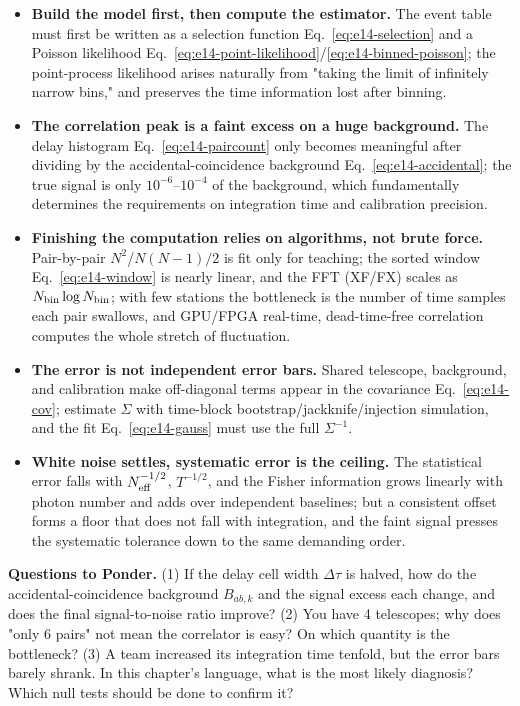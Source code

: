 \begin{itemize}
  \item \textbf{Build the model first, then compute the estimator.} The event table must first be written as a selection function Eq.~\eqref{eq:e14-selection} and a Poisson likelihood Eq.~\eqref{eq:e14-point-likelihood}/\eqref{eq:e14-binned-poisson}; the point-process likelihood arises naturally from "taking the limit of infinitely narrow bins," and preserves the time information lost after binning.
  \item \textbf{The correlation peak is a faint excess on a huge background.} The delay histogram Eq.~\eqref{eq:e14-paircount} only becomes meaningful after dividing by the accidental-coincidence background Eq.~\eqref{eq:e14-accidental}; the true signal is only $10^{-6}$--$10^{-4}$ of the background, which fundamentally determines the requirements on integration time and calibration precision.
  \item \textbf{Finishing the computation relies on algorithms, not brute force.} Pair-by-pair $N^2$/$N(N-1)/2$ is fit only for teaching; the sorted window Eq.~\eqref{eq:e14-window} is nearly linear, and the FFT (XF/FX) scales as $N_{\rm bin}\log N_{\rm bin}$; with few stations the bottleneck is the number of time samples each pair swallows, and GPU/FPGA real-time, dead-time-free correlation computes the whole stretch of fluctuation.
  \item \textbf{The error is not independent error bars.} Shared telescope, background, and calibration make off-diagonal terms appear in the covariance Eq.~\eqref{eq:e14-cov}; estimate $\Sigma$ with time-block bootstrap/jackknife/injection simulation, and the fit Eq.~\eqref{eq:e14-gauss} must use the full $\Sigma^{-1}$.
  \item \textbf{White noise settles, systematic error is the ceiling.} The statistical error falls with $N_{\rm eff}^{-1/2}$, $T^{-1/2}$, and the Fisher information grows linearly with photon number and adds over independent baselines; but a consistent offset forms a floor that does not fall with integration, and the faint signal presses the systematic tolerance down to the same demanding order.
\end{itemize}

\medskip
\noindent\textbf{Questions to Ponder.}
(1) If the delay cell width $\Delta\tau$ is halved, how do the accidental-coincidence background $B_{ab,k}$ and the signal excess each change, and does the final signal-to-noise ratio improve?
(2) You have 4 telescopes; why does "only 6 pairs" not mean the correlator is easy? On which quantity is the bottleneck?
(3) A team increased its integration time tenfold, but the error bars barely shrank. In this chapter's language, what is the most likely diagnosis? Which null tests should be done to confirm it?
